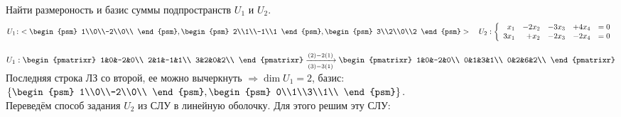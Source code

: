 \begin{prim}
	Найти размероность и базис суммы подпространств $U_1$ и $U_2$.
	$$
	U_1\!:~<
	\begin{psm}
	1\\0\\-2\\0\\
	\end{psm}
	,
	\begin{psm}
	2\\1\\-1\\1
	\end{psm}
	,
	\begin{psm}
	3\\2\\0\\2
	\end{psm}
	>
	\quad
	U_2:
	\left\{
	\begin{array}{rrrrl}
	x_1&-2x_2&-3x_3&+4x_4&=0\\
	3x_1&+x_2&-2x_3&-2x_4&=0\\
	\end{array}
	\right.
	$$
\end{prim}
$
U_1:
\begin{pmatrixr}
1&0&-2&0\\
2&1&-1&1\\
3&2&0&2\\
\end{pmatrixr}
\xrightarrow[(3)-3(1)]{(2)-2(1)}
\begin{pmatrixr}
1&0&-2&0\\
0&1&3&1\\
0&2&6&2\\
\end{pmatrixr}
$\\
Последняя строка ЛЗ со второй, ее можно вычеркнуть $\Rightarrow \dim U_1 = 2$, базис:
$\left\{
\begin{psm}
1\\0\\-2\\0\\
\end{psm}
,
\begin{psm}
0\\1\\3\\1\\
\end{psm}
\right\}.
$\\
Переведём способ задания $U_2$ из СЛУ в линейную оболочку. Для этого решим эту СЛУ:\\
